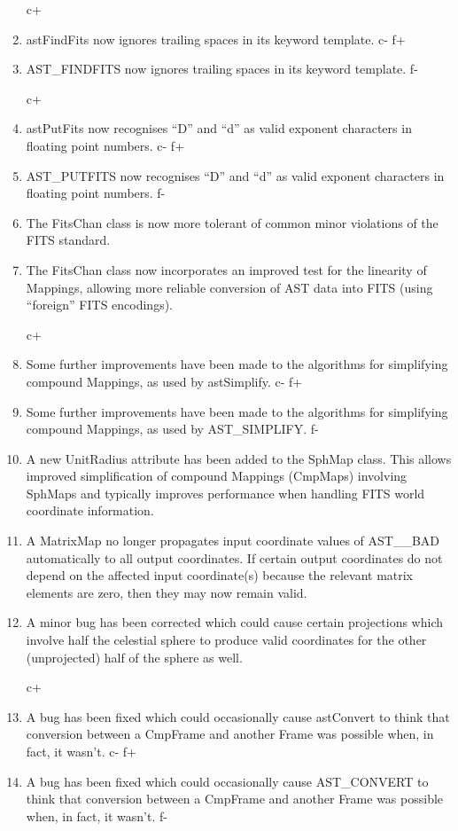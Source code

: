 \documentclass[twoside,11pt]{article}
\begin{document}
\begin{enumerate}
c+
\item astFindFits now ignores trailing spaces in its keyword template.
c-
f+
\item AST\_FINDFITS now ignores trailing spaces in its keyword template.
f-

c+
\item astPutFits now recognises ``D'' and ``d'' as valid exponent
characters in floating point numbers.
c-
f+
\item AST\_PUTFITS now recognises ``D'' and ``d'' as valid exponent
characters in floating point numbers.
f-

\item The FitsChan class is now more tolerant of common minor
violations of the FITS standard.

\item The FitsChan class now incorporates an improved test for the
linearity of Mappings, allowing more reliable conversion of AST data
into FITS (using ``foreign'' FITS encodings).

c+
\item Some further improvements have been made to the algorithms for
simplifying compound Mappings, as used by astSimplify.
c-
f+
\item Some further improvements have been made to the algorithms for
simplifying compound Mappings, as used by AST\_SIMPLIFY.
f-

\item A new UnitRadius attribute has been added to the SphMap
class. This allows improved simplification of compound Mappings
(CmpMaps) involving SphMaps and typically improves performance when
handling FITS world coordinate information.

\item A MatrixMap no longer propagates input coordinate values of
AST\_\_BAD automatically to all output coordinates. If certain output
coordinates do not depend on the affected input coordinate(s) because
the relevant matrix elements are zero, then they may now remain valid.

\item A minor bug has been corrected which could cause certain
projections which involve half the celestial sphere to produce valid
coordinates for the other (unprojected) half of the sphere as well.

c+
\item A bug has been fixed which could occasionally cause astConvert
to think that conversion between a CmpFrame and another Frame was
possible when, in fact, it wasn't.
c-
f+
\item A bug has been fixed which could occasionally cause AST\_CONVERT
to think that conversion between a CmpFrame and another Frame was
possible when, in fact, it wasn't.
f-
\end{enumerate}
\end{document}
